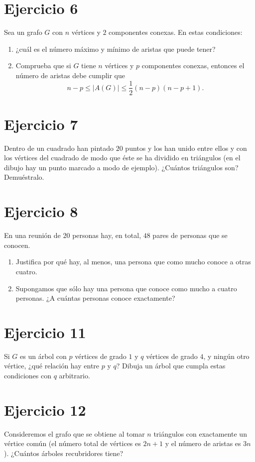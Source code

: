 \documentclass[12pt]{article}
\begin{document}
\section*{Ejercicio 6}
Sea un grafo $G$ con $n$ vértices y $2$ componentes conexas. En estas condiciones:
\begin{enumerate}
    \item ¿cuál es el número máximo y mínimo de aristas que puede tener?
    \item Comprueba que si $G$ tiene $n$ vértices y $p$ componentes conexas, entonces el número de aristas debe cumplir que
    \[
    n-p \le |A(G)| \le \frac{1}{2}(n-p)(n-p+1).
    \]
\end{enumerate}

\vspace{20cm}

\section*{Ejercicio 7}
Dentro de un cuadrado han pintado $20$ puntos y los han unido entre ellos y con los vértices del cuadrado de modo que éste se ha dividido en triángulos (en el dibujo hay un punto marcado a modo de ejemplo). ¿Cuántos triángulos son? Demuéstralo.

\vspace{10cm}

\section*{Ejercicio 8}
En una reunión de $20$ personas hay, en total, $48$ pares de personas que se conocen.
\begin{enumerate}
    \item Justifica por qué hay, al menos, una persona que como mucho conoce a otras cuatro.
    \item Supongamos que sólo hay una persona que conoce como mucho a cuatro personas. ¿A cuántas personas conoce exactamente?
\end{enumerate}

\vspace{10cm}

\section*{Ejercicio 11}
Si $G$ es un árbol con $p$ vértices de grado $1$ y $q$ vértices de grado $4$, y ningún otro vértice, ¿qué relación hay entre $p$ y $q$? Dibuja un árbol que cumpla estas condiciones con $q$ arbitrario.

\vspace{10cm}

\section*{Ejercicio 12}
Consideremos el grafo que se obtiene al tomar $n$ triángulos con exactamente un vértice común (el número total de vértices es $2n+1$ y el número de aristas es $3n$). ¿Cuántos árboles recubridores tiene?
\end{document}
